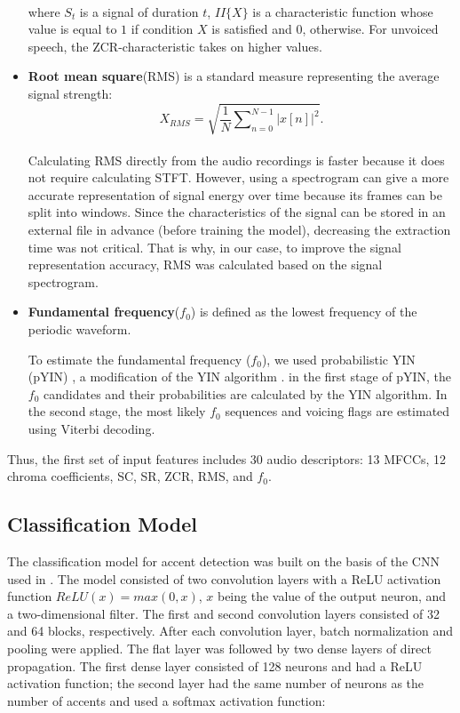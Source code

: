 \documentclass[ams]{U-AizuGT}
\begin{document}
\begin{itemize}
{\begin{equation}
\end{equation}\\
where $S_t$ is a signal of duration $t$, $II\{X\}$ is a characteristic function whose value is equal to $1$ if condition $X$ is satisfied and $0$, otherwise. For unvoiced speech, the ZCR-characteristic takes on higher values.
}
\item {\textbf{Root mean square}(RMS) is a standard measure representing the average signal strength:
\\
\begin{equation}
X_{RMS}=\sqrt{\frac{1}{N}\sum\nolimits_{n=0}^{N-1} |x[n]|^2}.
\end{equation}
\\
Calculating RMS directly from the audio recordings is faster because it does not require calculating STFT. However, using a spectrogram can give a more accurate representation of signal energy over time because its frames can be split into windows. Since the characteristics of the signal can be stored in an external file in advance (before training the model), decreasing the extraction time was not critical. That is why, in our case, to improve the signal representation accuracy, RMS was calculated based on the signal spectrogram.
}

\item {\textbf{Fundamental frequency}($f_0$) is defined as the lowest frequency of the periodic waveform.\par
To estimate the fundamental frequency ($f_0$), we used probabilistic YIN (pYIN) \cite{Mauch:pyi}, a modification of the YIN algorithm \cite{De:yin}. in the first stage of pYIN, the $f_0$ candidates and their probabilities are calculated by the YIN algorithm. In the second stage, the most likely $f_0$ sequences and voicing flags are estimated using Viterbi decoding.\par}

\end{itemize}

Thus, the first set of input features includes 30 audio descriptors: 13 MFCCs, 12 chroma coefficients, SC, SR, ZCR, RMS, and $f_0$.

\subsection{Classification Model}
The classification model for accent detection was built on the basis of the CNN used in \cite{Singh:fea}. The model consisted of two convolution layers with a ReLU activation function $ReLU(x)=max(0,x)$, $x$ being the value of the output neuron, and a two-dimensional filter. The first and second convolution layers consisted of 32 and 64 blocks, respectively. After each convolution layer, batch normalization and pooling were applied. The flat layer was followed by two dense layers of direct propagation.
The first dense layer consisted of 128 neurons and had a ReLU activation function; the second layer had the same number of neurons as the number of accents and used a softmax activation function:
\end{document}
